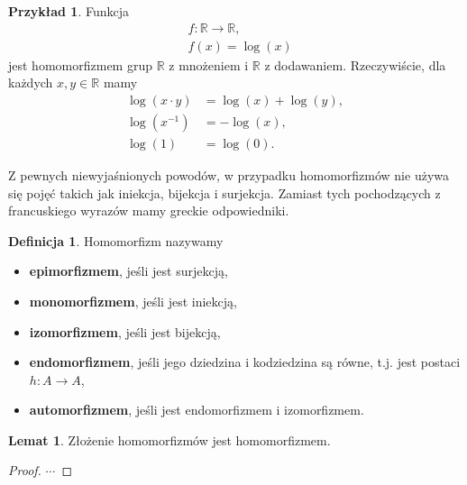 \documentclass{article}
\theoremstyle{definition}
\newtheorem{definition}{Definicja}[section]
\newtheorem{example}{Przykład}[section]
\newtheorem{lemma}{Lemat}[section]
\begin{document}
\begin{example}
	Funkcja
	\begin{align*}
		&f: \mathbb{R} \to \mathbb{R}, \\
		&f(x) = \log(x)
	\end{align*}
	jest homomorfizmem grup $\mathbb{R}$ z mnożeniem i $\mathbb{R}$ z dodawaniem.
	Rzeczywiście, dla każdych $x, y \in \mathbb{R}$ mamy
	\begin{align}
		\log(x \cdot y) &= \log(x) + \log(y), \\
		\log(x^{-1}) &= -\log(x), \\
		\log(1) &= \log(0).
	\end{align}
\end{example}

Z pewnych niewyjaśnionych powodów,
    w przypadku homomorfizmów nie używa się pojęć takich jak iniekcja, bijekcja i surjekcja.
Zamiast tych pochodzących z francuskiego wyrazów mamy greckie odpowiedniki.

\begin{definition}
    Homomorfizm nazywamy
    \begin{itemize}
        \item \textbf{epimorfizmem}, jeśli jest surjekcją,
        \item \textbf{monomorfizmem}, jeśli jest iniekcją,
        \item \textbf{izomorfizmem}, jeśli jest bijekcją,
        \item \textbf{endomorfizmem}, jeśli jego dziedzina i kodziedzina są równe, t.j. jest postaci $h:A \to A$,
        \item \textbf{automorfizmem}, jeśli jest endomorfizmem i izomorfizmem.
    \end{itemize}
\end{definition}

\begin{lemma}
	Złożenie homomorfizmów jest homomorfizmem.
\end{lemma}
\begin{proof}
	$\cdots$
\end{proof}
\end{document}
